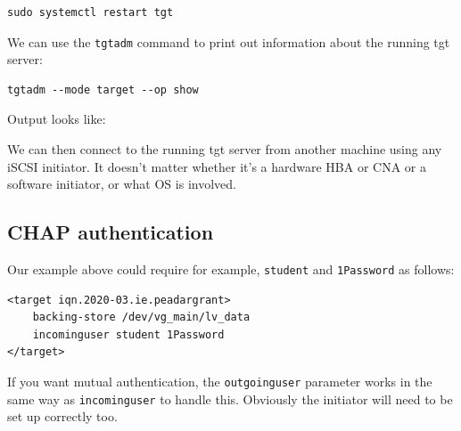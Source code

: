 \begin{verbatim}
sudo systemctl restart tgt
\end{verbatim}

We can use the \texttt{tgtadm} command to print out information about
the running tgt server:

\begin{verbatim}
tgtadm --mode target --op show
\end{verbatim}

Output looks like:

We can then connect to the running tgt server from another machine using
any iSCSI initiator. It doesn't matter whether it's a hardware HBA or
CNA or a software initiator, or what OS is involved.

\subsection{CHAP authentication}\label{chap-authentication}

Our example above could require for example, \texttt{student} and
\texttt{1Password} as follows:

\begin{verbatim}
<target iqn.2020-03.ie.peadargrant>
    backing-store /dev/vg_main/lv_data
    incominguser student 1Password
</target>
\end{verbatim}

If you want mutual authentication, the \texttt{outgoinguser} parameter
works in the same way as \texttt{incominguser} to handle this. Obviously
the initiator will need to be set up correctly too.
